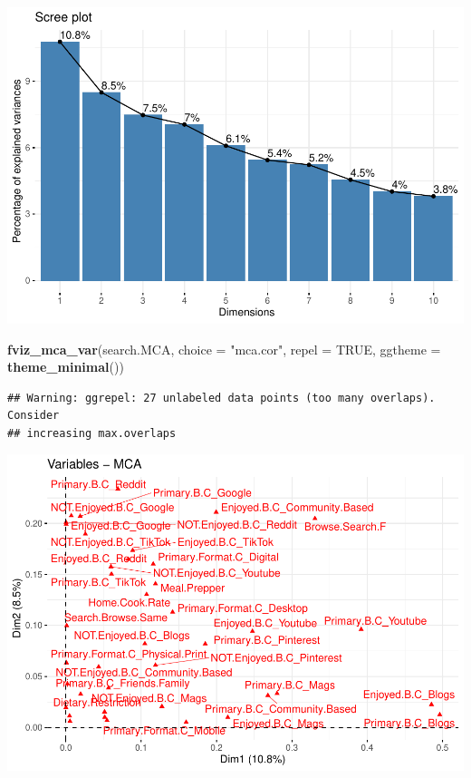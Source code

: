 \documentclass[
]{article}
\newenvironment{Shaded}{\begin{snugshade}}{\end{snugshade}}
\newcommand{\DataTypeTok}[1]{\textcolor[rgb]{0.13,0.29,0.53}{#1}}
\newcommand{\KeywordTok}[1]{\textcolor[rgb]{0.13,0.29,0.53}{\textbf{#1}}}
\newcommand{\NormalTok}[1]{#1}
\newcommand{\OtherTok}[1]{\textcolor[rgb]{0.56,0.35,0.01}{#1}}
\newcommand{\StringTok}[1]{\textcolor[rgb]{0.31,0.60,0.02}{#1}}
\begin{document}
\includegraphics{Average-User-MCA_files/figure-latex/mca browsing all-1.pdf}

\begin{Shaded}
\begin{Highlighting}[]
\KeywordTok{fviz_mca_var}\NormalTok{(search.MCA, }\DataTypeTok{choice =} \StringTok{"mca.cor"}\NormalTok{, }\DataTypeTok{repel =} \OtherTok{TRUE}\NormalTok{,}
             \DataTypeTok{ggtheme =} \KeywordTok{theme_minimal}\NormalTok{())}
\end{Highlighting}
\end{Shaded}

\begin{verbatim}
## Warning: ggrepel: 27 unlabeled data points (too many overlaps). Consider
## increasing max.overlaps
\end{verbatim}

\includegraphics{Average-User-MCA_files/figure-latex/mca browsing all-2.pdf}
\end{document}
